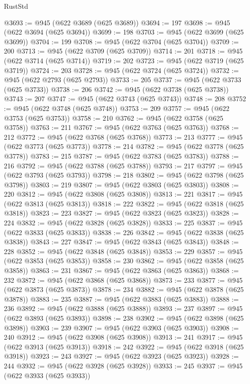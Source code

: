 \begin{lexlean}{RustStd}
\begin{coremodule}
@3693 := @945 (@622 @3689 (@625 @3689))
@3694 := 197
@3698 := @945 (@622 @3694 (@625 @3694))
@3699 := 198
@3703 := @945 (@622 @3699 (@625 @3699))
@3704 := 199
@3708 := @945 (@622 @3704 (@625 @3704))
@3709 := 200
@3713 := @945 (@622 @3709 (@625 @3709))
@3714 := 201
@3718 := @945 (@622 @3714 (@625 @3714))
@3719 := 202
@3723 := @945 (@622 @3719 (@625 @3719))
@3724 := 203
@3728 := @945 (@622 @3724 (@625 @3724))
@3732 := @945 (@622 @2793 (@625 @2793))
@3733 := 205
@3737 := @945 (@622 @3733 (@625 @3733))
@3738 := 206
@3742 := @945 (@622 @3738 (@625 @3738))
@3743 := 207
@3747 := @945 (@622 @3743 (@625 @3743))
@3748 := 208
@3752 := @945 (@622 @3748 (@625 @3748))
@3753 := 209
@3757 := @945 (@622 @3753 (@625 @3753))
@3758 := 210
@3762 := @945 (@622 @3758 (@625 @3758))
@3763 := 211
@3767 := @945 (@622 @3763 (@625 @3763))
@3768 := 212
@3772 := @945 (@622 @3768 (@625 @3768))
@3773 := 213
@3777 := @945 (@622 @3773 (@625 @3773))
@3778 := 214
@3782 := @945 (@622 @3778 (@625 @3778))
@3783 := 215
@3787 := @945 (@622 @3783 (@625 @3783))
@3788 := 216
@3792 := @945 (@622 @3788 (@625 @3788))
@3793 := 217
@3797 := @945 (@622 @3793 (@625 @3793))
@3798 := 218
@3802 := @945 (@622 @3798 (@625 @3798))
@3803 := 219
@3807 := @945 (@622 @3803 (@625 @3803))
@3808 := 220
@3812 := @945 (@622 @3808 (@625 @3808))
@3813 := 221
@3817 := @945 (@622 @3813 (@625 @3813))
@3818 := 222
@3822 := @945 (@622 @3818 (@625 @3818))
@3823 := 223
@3827 := @945 (@622 @3823 (@625 @3823))
@3828 := 224
@3832 := @945 (@622 @3828 (@625 @3828))
@3833 := 225
@3837 := @945 (@622 @3833 (@625 @3833))
@3838 := 226
@3842 := @945 (@622 @3838 (@625 @3838))
@3843 := 227
@3847 := @945 (@622 @3843 (@625 @3843))
@3848 := 228
@3852 := @945 (@622 @3848 (@625 @3848))
@3853 := 229
@3857 := @945 (@622 @3853 (@625 @3853))
@3858 := 230
@3862 := @945 (@622 @3858 (@625 @3858))
@3863 := 231
@3867 := @945 (@622 @3863 (@625 @3863))
@3868 := 232
@3872 := @945 (@622 @3868 (@625 @3868))
@3873 := 233
@3877 := @945 (@622 @3873 (@625 @3873))
@3878 := 234
@3882 := @945 (@622 @3878 (@625 @3878))
@3883 := 235
@3887 := @945 (@622 @3883 (@625 @3883))
@3888 := 236
@3892 := @945 (@622 @3888 (@625 @3888))
@3893 := 237
@3897 := @945 (@622 @3893 (@625 @3893))
@3898 := 238
@3902 := @945 (@622 @3898 (@625 @3898))
@3903 := 239
@3907 := @945 (@622 @3903 (@625 @3903))
@3908 := 240
@3912 := @945 (@622 @3908 (@625 @3908))
@3913 := 241
@3917 := @945 (@622 @3913 (@625 @3913))
@3918 := 242
@3922 := @945 (@622 @3918 (@625 @3918))
@3923 := 243
@3927 := @945 (@622 @3923 (@625 @3923))
@3928 := 244
@3932 := @945 (@622 @3928 (@625 @3928))
@3933 := 245
@3937 := @945 (@622 @3933 (@625 @3933))

\end{coremodule}
\end{lexlean}
